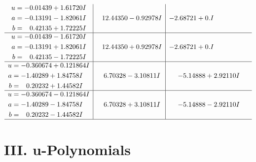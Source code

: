 \documentclass[1p]{elsarticle_modified}
\theoremstyle{definition}
\begin{document}
$$\begin{array}{c|c|c}
\begin{aligned}
u &= -0.01439 + 1.61720 I \\
a &= -0.13191 - 1.82061 I \\
b &= \phantom{-}0.42135 + 1.72225 I\end{aligned}
 & \phantom{-}12.44350 - 0.92978 I & -2.68721 + 0. I\phantom{ +0.000000I} \\ \hline\begin{aligned}
u &= -0.01439 - 1.61720 I \\
a &= -0.13191 + 1.82061 I \\
b &= \phantom{-}0.42135 - 1.72225 I\end{aligned}
 & \phantom{-}12.44350 + 0.92978 I & -2.68721 + 0. I\phantom{ +0.000000I} \\ \hline\begin{aligned}
u &= -0.360674 + 0.121864 I \\
a &= -1.40289 + 1.84758 I \\
b &= \phantom{-}0.20232 + 1.44582 I\end{aligned}
 & \phantom{-}6.70328 - 3.10811 I & -5.14888 + 2.92110 I \\ \hline\begin{aligned}
u &= -0.360674 - 0.121864 I \\
a &= -1.40289 - 1.84758 I \\
b &= \phantom{-}0.20232 - 1.44582 I\end{aligned}
 & \phantom{-}6.70328 + 3.10811 I & -5.14888 - 2.92110 I\\
 \hline 
 \end{array}$$\newpage
\newpage\renewcommand{\arraystretch}{1}
\centering \section*{ III. u-Polynomials}
\end{document}
